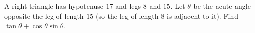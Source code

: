 A right triangle has hypotenuse $17$ and legs $8$ and $15$. Let $\theta$ be the acute angle opposite the leg of length $15$ (so the leg of length $8$ is adjacent to it). Find $\tan\theta+\cos\theta\sin\theta$.
